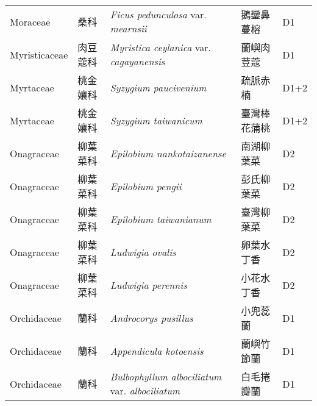 {\begin{longtable}{p{2.5cm}p{2.5cm}p{4.5cm}p{2.5cm}p{3cm}}
    Moraceae & 桑科 & \textit{Ficus pedunculosa} var. \textit{mearnsii}  & 鵝鑾鼻蔓榕 & D1 \index{Ficus@\textit{Ficus}!pedunculosa@\textit{pedunculosa}!var. mearnsii@var. \textit{mearnsii}}  \index{鵝鑾鼻蔓榕} \\
    Myristicaceae & 肉豆蔻科 & \textit{Myristica ceylanica} var. \textit{cagayanensis}  & 蘭嶼肉荳蔻 & D1 \index{Myristica@\textit{Myristica}!ceylanica@\textit{ceylanica}!var. cagayanensis@var. \textit{cagayanensis}}  \index{蘭嶼肉荳蔻} \\
    Myrtaceae & 桃金孃科 & \textit{Syzygium paucivenium}  & 疏脈赤楠 & D1+2 \index{Syzygium@\textit{Syzygium}!paucivenium@\textit{paucivenium}}  \index{疏脈赤楠} \\
    Myrtaceae & 桃金孃科 & \textit{Syzygium taiwanicum}  & 臺灣棒花蒲桃 & D1+2 \index{Syzygium@\textit{Syzygium}!taiwanicum@\textit{taiwanicum}}  \index{臺灣棒花蒲桃} \\
    Onagraceae & 柳葉菜科 & \textit{Epilobium nankotaizanense}  & 南湖柳葉菜 & D2 \index{Epilobium@\textit{Epilobium}!nankotaizanense@\textit{nankotaizanense}}  \index{南湖柳葉菜} \\
    Onagraceae & 柳葉菜科 & \textit{Epilobium pengii}  & 彭氏柳葉菜 & D2 \index{Epilobium@\textit{Epilobium}!pengii@\textit{pengii}}  \index{彭氏柳葉菜} \\
    Onagraceae & 柳葉菜科 & \textit{Epilobium taiwanianum}  & 臺灣柳葉菜 & D2 \index{Epilobium@\textit{Epilobium}!taiwanianum@\textit{taiwanianum}}  \index{臺灣柳葉菜} \\
    Onagraceae & 柳葉菜科 & \textit{Ludwigia ovalis}  & 卵葉水丁香 & D2 \index{Ludwigia@\textit{Ludwigia}!ovalis@\textit{ovalis}}  \index{卵葉水丁香} \\
    Onagraceae & 柳葉菜科 & \textit{Ludwigia perennis}  & 小花水丁香 & D2 \index{Ludwigia@\textit{Ludwigia}!perennis@\textit{perennis}}  \index{小花水丁香} \\
    Orchidaceae & 蘭科 & \textit{Androcorys pusillus}  & 小兜蕊蘭 & D1 \index{Androcorys@\textit{Androcorys}!pusillus@\textit{pusillus}}  \index{小兜蕊蘭} \\
    Orchidaceae & 蘭科 & \textit{Appendicula kotoensis}  & 蘭嶼竹節蘭 & D1 \index{Appendicula@\textit{Appendicula}!kotoensis@\textit{kotoensis}}  \index{蘭嶼竹節蘭} \\
    Orchidaceae & 蘭科 & \textit{Bulbophyllum albociliatum} var. \textit{albociliatum}  & 白毛捲瓣蘭 & D1 \index{Bulbophyllum@\textit{Bulbophyllum}!albociliatum@\textit{albociliatum}!var. albociliatum@var. \textit{albociliatum}}  \index{白毛捲瓣蘭} \\

\end{longtable}}
